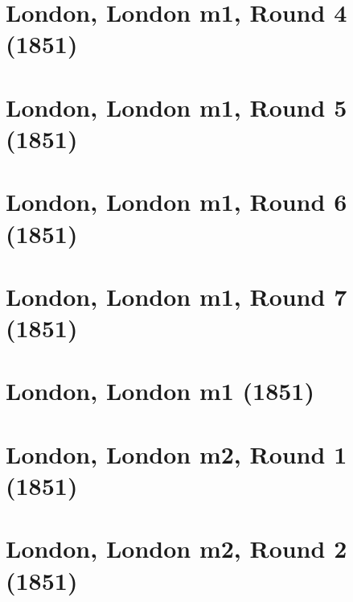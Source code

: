 \documentclass[11pt]{article}
\newcommand*\cleartoleftpage{%
   \clearpage
   \ifodd\value{page}\hbox{}\newpage\fi
}
\begin{document}
\cleartoleftpage

\section{London, London m1, Round 4 (1851)}


\cleartoleftpage

\section{London, London m1, Round 5 (1851)}


\cleartoleftpage

\section{London, London m1, Round 6 (1851)}


\cleartoleftpage

\section{London, London m1, Round 7 (1851)}


\cleartoleftpage

\section{London, London m1 (1851)}


\cleartoleftpage



\cleartoleftpage



\cleartoleftpage



\cleartoleftpage

\section{London, London m2, Round 1 (1851)}


\cleartoleftpage

\section{London, London m2, Round 2 (1851)}

\end{document}
